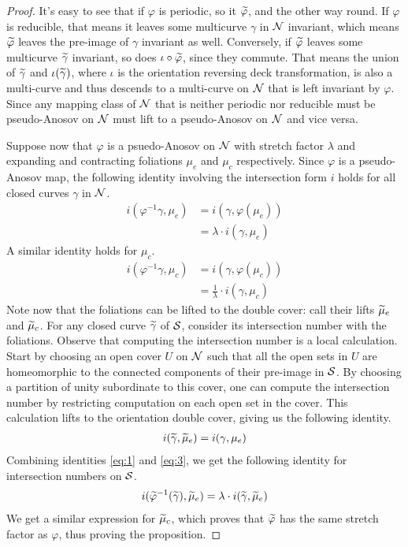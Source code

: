 \begin{proof}
  It's easy to see that if $\varphi$ is periodic, so it $\widetilde{\varphi}$, and the other way round.
  If $\varphi$ is reducible, that means it leaves some multicurve $\gamma$ in $\mathcal{N}$ invariant, which means $\widetilde{\varphi}$ leaves the pre-image of $\gamma$ invariant as well.
  Conversely, if $\widetilde{\varphi}$ leaves some multicurve $\widetilde{\gamma}$ invariant, so does $\iota \circ \widetilde{\varphi}$, since they commute.
  That means the union of $\widetilde{\gamma}$ and $\iota(\widetilde{\gamma})$, where $\iota$ is the orientation reversing deck transformation, is also a multi-curve and thus descends to a multi-curve on $\mathcal{N}$ that is left invariant by $\varphi$.
  Since any mapping class of $\mathcal{N}$ that is neither periodic nor reducible must be pseudo-Anosov on $\mathcal{N}$ must lift to a pseudo-Anosov on $\mathcal{N}$ and vice versa.

  Suppose now that $\varphi$ is a psuedo-Anosov on $\mathcal{N}$ with stretch factor $\lambda$ and expanding and contracting foliations $\mu_e$ and $\mu_c$ respectively.
  Since $\varphi$ is a pseudo-Anosov map, the following identity involving the intersection form $i$ holds for all closed curves $\gamma$ in $\mathcal{N}$.
  \begin{align}
    \label{eq:1}
    i(\varphi^{-1}\gamma, \mu_e) &= i(\gamma, \varphi(\mu_e)) \\
                               &= \lambda \cdot i(\gamma, \mu_e)
  \end{align}
  A similar identity holds for $\mu_c$.
  \begin{align}
    \label{eq:2}
    i(\varphi^{-1}\gamma, \mu_c) &= i(\gamma, \varphi(\mu_c)) \\
                               &= \frac{1}{\lambda} \cdot i(\gamma, \mu_c)
  \end{align}
  Note now that the foliations can be lifted to the double cover: call their lifts $\widetilde{\mu}_e$ and $\widetilde{\mu}_c$.
  For any closed curve $\widetilde{\gamma}$ of $\mathcal{S}$, consider its intersection number with the foliations.
  Observe that computing the intersection number is a local calculation.
  Start by choosing an open cover $U$ on $\mathcal{N}$ such that all the open sets in $U$ are homeomorphic to the connected components of their pre-image in $\mathcal{S}$.
  By choosing a partition of unity subordinate to this cover, one can compute the intersection number by restricting computation on each open set in the cover.
  This calculation lifts to the orientation double cover, giving us the following identity.
  \begin{align}
    \label{eq:3}
    i(\widetilde{\gamma}, \widetilde{\mu}_e) = i(\gamma, \mu_e)
  \end{align}
  Combining identities \eqref{eq:1} and \eqref{eq:3}, we get the following identity for intersection numbers on $\mathcal{S}$.
  \begin{align*}
    i(\widetilde{\varphi}^{-1} (\widetilde{\gamma}), \widetilde{\mu}_e) = \lambda \cdot i(\widetilde{\gamma}, \widetilde{\mu}_e)
  \end{align*}
  We get a similar expression for $\widetilde{\mu}_c$, which proves that $\widetilde{\varphi}$ has the same stretch factor as $\varphi$, thus proving the proposition.
\end{proof}

